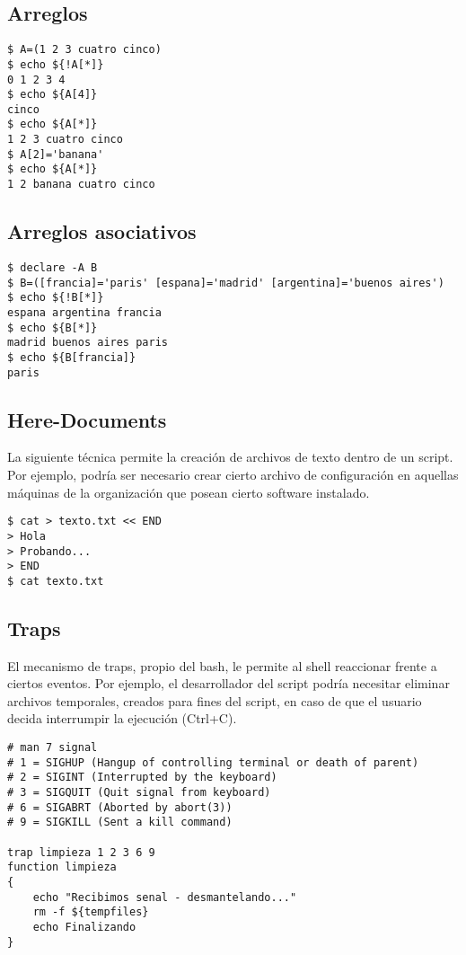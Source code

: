 \subsection{Arreglos}

\begin{lstlisting}
$ A=(1 2 3 cuatro cinco)
$ echo ${!A[*]}
0 1 2 3 4
$ echo ${A[4]}
cinco
$ echo ${A[*]}
1 2 3 cuatro cinco
$ A[2]='banana'
$ echo ${A[*]}
1 2 banana cuatro cinco
\end{lstlisting}

\subsection{Arreglos asociativos}
\begin{lstlisting}
$ declare -A B
$ B=([francia]='paris' [espana]='madrid' [argentina]='buenos aires')
$ echo ${!B[*]}
espana argentina francia
$ echo ${B[*]}
madrid buenos aires paris
$ echo ${B[francia]}
paris
\end{lstlisting}


\subsection{Here-Documents}

La siguiente técnica permite la creación de archivos de texto dentro de un script. Por ejemplo, podría ser 
necesario crear cierto archivo de configuración en aquellas máquinas de la organización que posean cierto 
software instalado. 

\begin{lstlisting}
$ cat > texto.txt << END
> Hola
> Probando...
> END
$ cat texto.txt
\end{lstlisting}

\subsection{Traps}

El mecanismo de traps, propio del bash, le permite al shell reaccionar frente a ciertos eventos. Por ejemplo,
el desarrollador del script podría necesitar eliminar archivos temporales, creados para fines del script, en caso
de que el usuario decida interrumpir la ejecución (Ctrl+C). 

\begin{lstlisting}
# man 7 signal
# 1 = SIGHUP (Hangup of controlling terminal or death of parent)
# 2 = SIGINT (Interrupted by the keyboard)
# 3 = SIGQUIT (Quit signal from keyboard)
# 6 = SIGABRT (Aborted by abort(3))
# 9 = SIGKILL (Sent a kill command)

trap limpieza 1 2 3 6 9
function limpieza
{
	echo "Recibimos senal - desmantelando..."
	rm -f ${tempfiles}
	echo Finalizando
}
\end{lstlisting}



